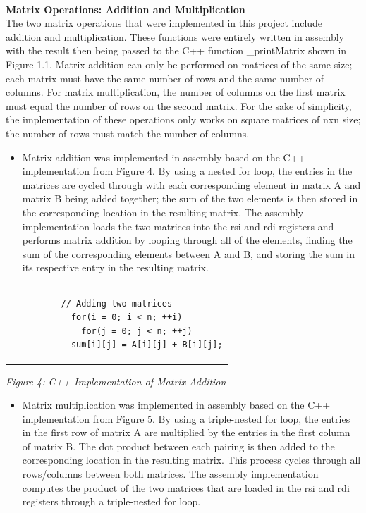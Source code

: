 \documentclass[twoside]{article}
\begin{document}
\noindent \\ \textbf{Matrix Operations: Addition and Multiplication}
\\The two matrix operations that were implemented in this project include addition and multiplication. These functions were entirely written in assembly with the result then being passed to the C++ function \_printMatrix shown in Figure 1.1. Matrix addition can only be performed on matrices of the same size; each matrix must have the same number of rows and the same number of columns. For matrix multiplication, the number of columns on the first matrix must equal the number of rows on the second matrix. For the sake of simplicity, the implementation of these operations only works on square matrices of nxn size; the number of rows must match the number of columns.\\
\begin{itemize}
\item Matrix addition was implemented in assembly based on the C++ implementation from Figure 4. By using a nested for loop, the entries in the matrices are cycled through with each corresponding element in matrix A and matrix B being added together; the sum of the two elements is then stored in the corresponding location in the resulting matrix. The assembly implementation loads the two matrices into the rsi and rdi registers and performs matrix addition by looping through all of the elements, finding the sum of the corresponding elements between A and B, and storing the sum in its respective entry in the resulting matrix.
\end{itemize}
\begin{center} \begin{tabular}{c} \begin{lstlisting}
// Adding two matrices
    for(i = 0; i < n; ++i)
        for(j = 0; j < n; ++j)
            sum[i][j] = A[i][j] + B[i][j];
\end{lstlisting} \end{tabular} \end{center}
\begin{center}\textit{Figure 4: C++ Implementation of Matrix Addition}\end{center}
\begin{itemize}
\item Matrix multiplication was implemented in assembly based on the C++ implementation from Figure 5. By using a triple-nested for loop, the entries in the first row of matrix A are multiplied by the entries in the first column of matrix B. The dot product between each pairing is then added to the corresponding location in the resulting matrix. This process cycles through all rows/columns between both matrices. The assembly implementation computes the product of the two matrices that are loaded in the rsi and rdi registers through a triple-nested for loop.
\end{itemize}
\end{document}
